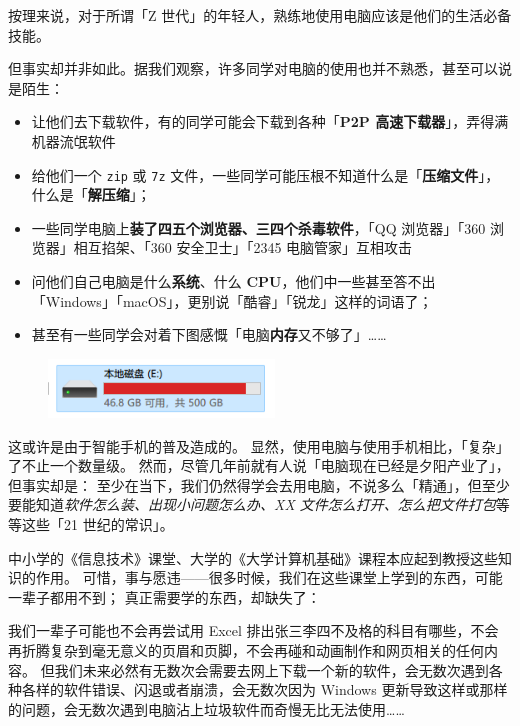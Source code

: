 \documentclass[a4paper,x11names]{book}
\begin{document}
按理来说，对于所谓「Z 世代」的年轻人，熟练地使用电脑应该是他们的生活必备技能。

但事实却并非如此。据我们观察，许多同学对电脑的使用也并不熟悉，甚至可以说是陌生：

\begin{itemize}
  \item 让他们去下载软件，有的同学可能会下载到各种「\textbf{P2P 高速下载器}」，弄得满机器流氓软件
  \item 给他们一个 \texttt{zip} 或 \texttt{7z} 文件，一些同学可能压根不知道什么是「\textbf{压缩文件}」，什么是「\textbf{解压缩}」；
  \item 一些同学电脑上\textbf{装了四五个浏览器、三四个杀毒软件}，「QQ 浏览器」「360 浏览器」相互掐架、「360 安全卫士」「2345 电脑管家」互相攻击
  \item 问他们自己电脑是什么\textbf{系统}、什么 \textbf{CPU}，他们中一些甚至答不出「Windows」「macOS」，更别说「酷睿」「锐龙」这样的词语了；
  \item 甚至有一些同学会对着下图感慨「电脑\textbf{内存}又不够了」……
\end{itemize}

\begin{figure}[htb!]
  \centering
  \includegraphics[width=6cm]{src/Storage_Shortage.png}
\end{figure}

这或许是由于智能手机的普及造成的。
显然，使用电脑与使用手机相比，「复杂」了不止一个数量级。
然而，尽管几年前就有人说「电脑现在已经是夕阳产业了」，但事实却是：
至少在当下，我们仍然得学会去用电脑，不说多么「精通」，但至少要能知道\textit{软件怎么装、出现小问题怎么办、XX 文件怎么打开、怎么把文件打包}等等这些「21 世纪的常识」。

中小学的《信息技术》课堂、大学的《大学计算机基础》课程本应起到教授这些知识的作用。
可惜，事与愿违——很多时候，我们在这些课堂上学到的东西，可能一辈子都用不到；
真正需要学的东西，却缺失了：

我们一辈子可能也不会再尝试用 Excel 排出张三李四不及格的科目有哪些，不会再折腾复杂到毫无意义的页眉和页脚，不会再碰和动画制作和网页相关的任何内容。
但我们未来必然有无数次会需要去网上下载一个新的软件，会无数次遇到各种各样的软件错误、闪退或者崩溃，会无数次因为 Windows 更新导致这样或那样的问题，会无数次遇到电脑沾上垃圾软件而奇慢无比无法使用……
\end{document}
